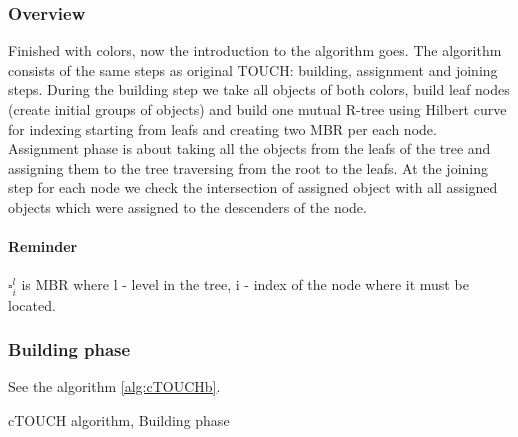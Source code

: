 \documentclass{sig-alternate}
\begin{document}
\subsubsection{Overview}Finished with colors, now the introduction to the algorithm goes. The algorithm consists of the same steps as original TOUCH: building, assignment and joining steps. During the building step we take all objects of both colors, build leaf nodes (create initial groups of objects) and build one mutual R-tree using Hilbert curve for indexing starting from leafs and creating two MBR per each node. Assignment phase is about taking all the objects from the leafs of the tree and assigning them to the tree traversing from the root to the leafs. At the joining step for each node we check the intersection of assigned object with all assigned objects which were assigned to the descenders of the node.

\paragraph{Reminder} $\square^{l}_i$ is MBR where l - level in the tree, i - index of the node where it must be located.

\subsubsection{Building phase}
See the algorithm \ref{alg:cTOUCHb}.

\begin{algorithm}
\caption{cTOUCH algorithm, Building phase}
\label{alg:cTOUCHb}
\begin{algorithmic}[1]

    \EndFor
  \EndFor
\EndWhile
{}
\end{algorithmic}
\end{algorithm}
\end{document}
